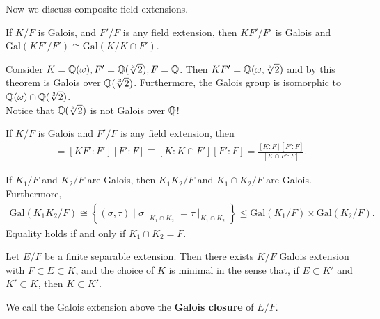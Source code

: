 \documentclass{memoir}
\begin{document}


Now we discuss composite field extensions.
\begin{prop}
	If \(K / F\) is Galois, and \(F' / F\) is any field extension, then \(KF' / F'\) is Galois and \(\textrm{Gal}(KF' / F') \cong \textrm{Gal}(K / K\cap F')\).
\end{prop}

\begin{exmp}
	Consider \(K = \mathbb{Q}(\omega ), F' = \mathbb{Q}(\sqrt[3]{2} ), F = \mathbb{Q}\). Then \(KF' = \mathbb{Q}(\omega ,\sqrt[3]{2}) \) and by this theorem is Galois over \(\mathbb{Q}(\sqrt[3]{2} )\). Furthermore, the Galois group is isomorphic to \(\mathbb{Q}(\omega )\cap \mathbb{Q}(\sqrt[3]{2} )\).\\

	Notice that \(\mathbb{Q}(\sqrt[3]{2}) \) is not Galois over \(\mathbb{Q}\)!
\end{exmp}

\begin{cor}
	If \(K / F\) is Galois and \(F' / F\) is any field extension, then
	\begin{align*}
		[KF':F] = [KF':F'][F':F] \equiv [K:K\cap F'][F':F] = \frac{[K:F][F':F]}{[K\cap F' : F]}.
	\end{align*}
\end{cor}

\begin{prop}
	If \(K_1 / F\) and \(K_2 / F\) are Galois, then \(K_1K_2 / F\) and \(K_1\cap K_2 / F\) are Galois. Furthermore,
	\begin{align*}
	\textrm{Gal}(K_1K_2 / F) \cong \left\{ (\sigma ,\tau ) \mid \sigma\mid_{K_1 \cap K_2} = \tau\mid_{K_1 \cap K_2} \right\} \leq \textrm{Gal}(K_1 / F) \times \textrm{Gal}(K_2 / F).
\end{align*}
	Equality holds if and only if \(K_1\cap K_2 = F\).
\end{prop}

\begin{cor}
	Let \(E / F\) be a finite separable extension. Then there exists \(K / F\) Galois extension with \(F \subset E \subset K\), and the choice of \(K\) is minimal in the sense that, if \(E\subset K'\) and \(K' \subset \overline{K}\), then \(K\subset K'\).	
\end{cor}
We call the Galois extension above the \textbf{Galois closure} of \(E / F\).
\end{document}
